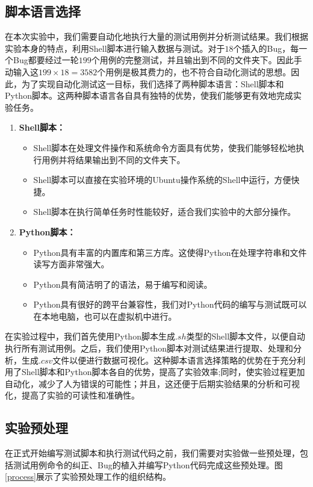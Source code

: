 \documentclass[12pt, a4paper, oneside,bibend=bibtex]{ctexart}
\begin{document}
\subsection{脚本语言选择} \label{脚本选择章节}
在本次实验中，我们需要自动化地执行大量的测试用例并分析测试结果。我们根据实验本身的特点，利用Shell脚本进行输入数据与测试。对于$18$个插入的Bug，每一个Bug都要经过一轮$199$个用例的完整测试，并且输出到不同的文件夹下。因此手动输入这$199\times 18=3582$个用例是极其费力的，也不符合自动化测试的思想。因此，为了实现自动化测试这一目标，我们选择了两种脚本语言：Shell脚本和Python脚本。这两种脚本语言各自具有独特的优势，使我们能够更有效地完成实验任务。
\begin{enumerate}
    \item \textbf{Shell脚本：}
    \begin{itemize}
        \item Shell脚本在处理文件操作和系统命令方面具有优势，使我们能够轻松地执行用例并将结果输出到不同的文件夹下。
        \item Shell脚本可以直接在实验环境的Ubuntu操作系统的Shell中运行，方便快捷。
        \item Shell脚本在执行简单任务时性能较好，适合我们实验中的大部分操作。
    \end{itemize}
    \item \textbf{Python脚本：}
    \begin{itemize}
        \item Python具有丰富的内置库和第三方库。这使得Python在处理字符串和文件读写方面非常强大。
        \item Python具有简洁明了的语法，易于编写和阅读。
        \item Python具有很好的跨平台兼容性，我们对Python代码的编写与测试既可以在本地电脑，也可以在虚拟机中进行。
    \end{itemize}
\end{enumerate}
在实验过程中，我们首先使用Python脚本生成$.sh$类型的Shell脚本文件，以便自动执行所有测试用例。之后，我们使用Python脚本对测试结果进行提取、处理和分析，生成$.csv$文件以便进行数据可视化。这种脚本语言选择策略的优势在于充分利用了Shell脚本和Python脚本各自的优势，提高了实验效率;同时，使实验过程更加自动化，减少了人为错误的可能性；并且，这还便于后期实验结果的分析和可视化，提高了实验的可读性和准确性。


\subsection{实验预处理}
在正式开始编写测试脚本和执行测试代码之前，我们需要对实验做一些预处理，包括测试用例命令的纠正、Bug的植入并编写Python代码完成这些预处理。图\ref{process}展示了实验预处理工作的组织结构。
\end{document}

